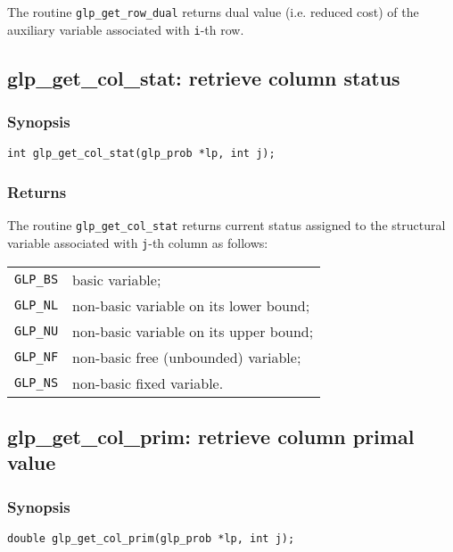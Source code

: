 The routine \verb|glp_get_row_dual| returns dual value (i.e. reduced
cost) of the auxiliary variable associated with \verb|i|-th row.

\newpage

\subsection{glp\_get\_col\_stat: retrieve column status}

\subsubsection*{Synopsis}

\begin{verbatim}
int glp_get_col_stat(glp_prob *lp, int j);
\end{verbatim}

\subsubsection*{Returns}

The routine \verb|glp_get_col_stat| returns current status assigned to
the structural variable associated with \verb|j|-th column as follows:

\begin{tabular}{@{}ll}
\verb|GLP_BS| & basic variable; \\
\verb|GLP_NL| & non-basic variable on its lower bound; \\
\verb|GLP_NU| & non-basic variable on its upper bound; \\
\verb|GLP_NF| & non-basic free (unbounded) variable; \\
\verb|GLP_NS| & non-basic fixed variable. \\
\end{tabular}

\subsection{glp\_get\_col\_prim: retrieve column primal value}

\subsubsection*{Synopsis}

\begin{verbatim}
double glp_get_col_prim(glp_prob *lp, int j);
\end{verbatim}

